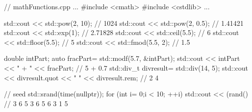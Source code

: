 \begin{cpp}
// mathFunctions.cpp
...
#include <cmath>
#include <cstdlib>
...

std::cout << std::pow(2, 10); // 1024
std::cout << std::pow(2, 0.5); // 1.41421
std::cout << std::exp(1); // 2.71828
std::cout << std::ceil(5.5); // 6
std::cout << std::floor(5.5); // 5
std::cout << std::fmod(5.5, 2); // 1.5

double intPart;
auto fracPart= std::modf(5.7, &intPart);
std::cout << intPart << " + " << fracPart; // 5 + 0.7
std::div_t divresult= std::div(14, 5);
std::cout << divresult.quot << " " << divresult.rem; // 2 4

// seed
std::srand(time(nullptr));
for (int i= 0;i < 10; ++i) std::cout << (rand()%
											// 3 6 5 3 6 5 6 3 1 5
\end{cpp}
















